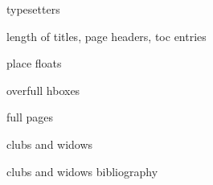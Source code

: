 typesetters

length of titles, page headers, toc entries

place floats

overfull hboxes

full pages

clubs and widows

clubs and widows bibliography

